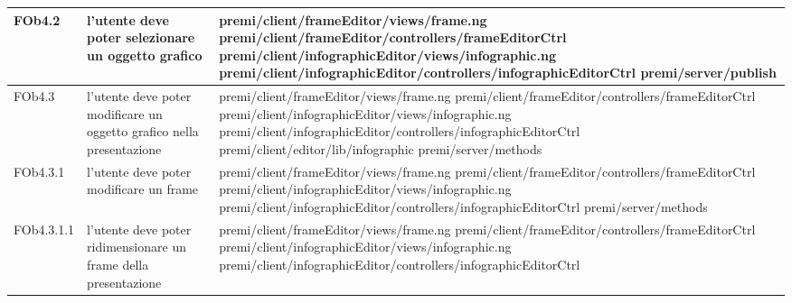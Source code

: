\begin{longtable}{|l|p{5cm}|p{7cm}|}
\hline
FOb4.2 & l'utente deve poter selezionare un oggetto grafico & \hspace{0pt}premi/client/frameEditor/views/frame.ng \linebreak \linebreak premi/client/frameEditor/controllers/frameEditorCtrl \linebreak \linebreak premi/client/infographicEditor/views/infographic.ng \linebreak \linebreak premi/client/infographicEditor/controllers/infographicEditorCtrl \linebreak \linebreak premi/server/publish \\
\hline
FOb4.3 & l'utente deve poter modificare un oggetto grafico nella presentazione & \hspace{0pt}premi/client/frameEditor/views/frame.ng \linebreak \linebreak premi/client/frameEditor/controllers/frameEditorCtrl \linebreak \linebreak premi/client/infographicEditor/views/infographic.ng \linebreak \linebreak premi/client/infographicEditor/controllers/infographicEditorCtrl \linebreak \linebreak premi/client/editor/lib/infographic \linebreak \linebreak premi/server/methods \\
\hline
FOb4.3.1 & l'utente deve poter modificare un frame & \hspace{0pt}premi/client/frameEditor/views/frame.ng \linebreak \linebreak premi/client/frameEditor/controllers/frameEditorCtrl \linebreak \linebreak premi/client/infographicEditor/views/infographic.ng \linebreak \linebreak premi/client/infographicEditor/controllers/infographicEditorCtrl  \linebreak \linebreak premi/server/methods \\
\hline
FOb4.3.1.1 & l'utente deve poter ridimensionare un frame della presentazione & \hspace{0pt}premi/client/frameEditor/views/frame.ng \linebreak \linebreak premi/client/frameEditor/controllers/frameEditorCtrl \linebreak \linebreak premi/client/infographicEditor/views/infographic.ng \linebreak \linebreak premi/client/infographicEditor/controllers/infographicEditorCtrl \\

\end{longtable}
